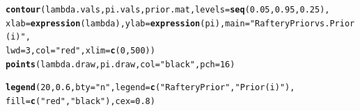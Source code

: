 \documentclass[12pt]{article}\usepackage[]{graphicx}\usepackage[]{color}
\makeatletter
\newcommand{\hlnum}[1]{\textcolor[rgb]{0.686,0.059,0.569}{#1}}%
\newcommand{\hlstr}[1]{\textcolor[rgb]{0.192,0.494,0.8}{#1}}%
\newcommand{\hlstd}[1]{\textcolor[rgb]{0.345,0.345,0.345}{#1}}%
\newcommand{\hlkwc}[1]{\textcolor[rgb]{0.333,0.667,0.333}{#1}}%
\newcommand{\hlkwd}[1]{\textcolor[rgb]{0.737,0.353,0.396}{\textbf{#1}}}%
\newenvironment{kframe}{%
 \def\at@end@of@kframe{}%
 \ifinner\ifhmode%
  \def\at@end@of@kframe{\end{minipage}}%
  \begin{minipage}{\columnwidth}%
 \fi\fi%
 \def\FrameCommand##1{\hskip\@totalleftmargin \hskip-\fboxsep
 \colorbox{shadecolor}{##1}\hskip-\fboxsep
     \hskip-\linewidth \hskip-\@totalleftmargin \hskip\columnwidth}%
 \MakeFramed {\advance\hsize-\width
   \@totalleftmargin\z@ \linewidth\hsize
   \@setminipage}}%
 {\par\unskip\endMakeFramed%
 \at@end@of@kframe}
\newenvironment{knitrout}{}{} %
\makeatother
\begin{document}
\begin{knitrout}
\begin{kframe}
\begin{alltt}
\hlkwd{contour}\hlstd{(lambda.vals, pi.vals, prior.mat,} \hlkwc{levels}\hlstd{=}\hlkwd{seq}\hlstd{(}\hlnum{0.05}\hlstd{,} \hlnum{0.95}\hlstd{,} \hlnum{0.25}\hlstd{),}
        \hlkwc{xlab}\hlstd{=}\hlkwd{expression}\hlstd{(lambda),} \hlkwc{ylab}\hlstd{=}\hlkwd{expression}\hlstd{(pi),} \hlkwc{main}\hlstd{=}\hlstr{"Raftery Prior vs. Prior (i)"}\hlstd{,}
        \hlkwc{lwd}\hlstd{=}\hlnum{3}\hlstd{,} \hlkwc{col}\hlstd{=}\hlstr{"red"}\hlstd{,} \hlkwc{xlim} \hlstd{=} \hlkwd{c}\hlstd{(}\hlnum{0}\hlstd{,} \hlnum{500}\hlstd{))}
\hlkwd{points}\hlstd{(lambda.draw, pi.draw,} \hlkwc{col}\hlstd{=}\hlstr{"black"}\hlstd{,} \hlkwc{pch}\hlstd{=}\hlnum{16}\hlstd{)}

\hlkwd{legend}\hlstd{(}\hlnum{20}\hlstd{,} \hlnum{0.6}\hlstd{,} \hlkwc{bty}\hlstd{=}\hlstr{"n"}\hlstd{,} \hlkwc{legend}\hlstd{=}\hlkwd{c}\hlstd{(}\hlstr{"Raftery Prior"}\hlstd{,} \hlstr{"Prior (i)"}\hlstd{),}
       \hlkwc{fill}\hlstd{=}\hlkwd{c}\hlstd{(}\hlstr{"red"}\hlstd{,} \hlstr{"black"}\hlstd{),} \hlkwc{cex}\hlstd{=}\hlnum{0.8}\hlstd{)}
\end{alltt}
\end{kframe}
\end{knitrout}
\end{document}
